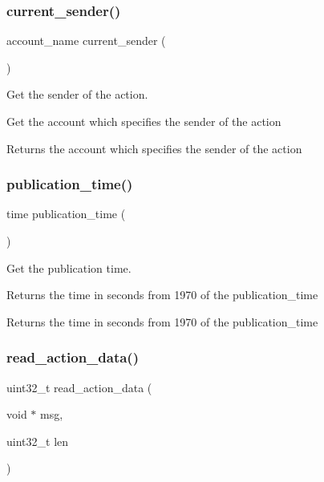 \subsubsection{\texorpdfstring{current\+\_\+sender()}{current\_sender()}}
{\footnotesize\ttfamily account\+\_\+name current\+\_\+sender (\begin{DoxyParamCaption}{ }\end{DoxyParamCaption})}



Get the sender of the action. 

Get the account which specifies the sender of the action \begin{DoxyReturn}{Returns}
the account which specifies the sender of the action 
\end{DoxyReturn}
\mbox{\label{group__actioncapi_ga761ba259bec8bbdab79b31b716a5d4d6}} 
\subsubsection{\texorpdfstring{publication\+\_\+time()}{publication\_time()}}
{\footnotesize\ttfamily time publication\+\_\+time (\begin{DoxyParamCaption}{ }\end{DoxyParamCaption})}



Get the publication time. 

Returns the time in seconds from 1970 of the publication\+\_\+time \begin{DoxyReturn}{Returns}
the time in seconds from 1970 of the publication\+\_\+time 
\end{DoxyReturn}
\mbox{\label{group__actioncapi_ga4de6d1722b92b464ba2c999e0a636f84}} 
\subsubsection{\texorpdfstring{read\+\_\+action\+\_\+data()}{read\_action\_data()}}
{\footnotesize\ttfamily uint32\+\_\+t read\+\_\+action\+\_\+data (\begin{DoxyParamCaption}\item[{void $\ast$}]{msg,  }\item[{uint32\+\_\+t}]{len }\end{DoxyParamCaption})}



